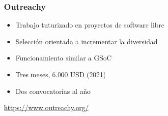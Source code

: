 \begin{frame}
\frametitle{Outreachy}

{\Large

\begin{itemize}
\item Trabajo tuturizado en proyectos de software libre
\item Selección orientada a incrementar la diversidad
\item Funcionamiento similar a GSoC
\item Tres meses, 6.000 USD (2021)
\item Dos convocatorias al año
\end{itemize}

\vspace{1cm}

\begin{flushright}
  \url{https://www.outreachy.org/}
\end{flushright}
}

\end{frame}

